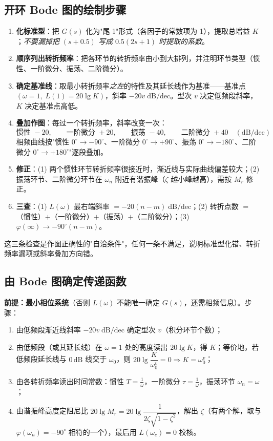 \subsection{开环 Bode 图的绘制步骤}
\begin{enumerate}
    \item \textbf{化标准型}：把 $G(s)$ 化为"尾 1"形式（各因子的常数项为 1），提取总增益 $K$；\emph{不要漏掉把 $(s+0.5)$ 写成 $0.5(2s+1)$ 时提取的系数}。
    \item \textbf{顺序列出转折频率}：把各环节的转折频率由小到大排列，并注明环节类型（惯性、一阶微分、振荡、二阶微分）。
    \item \textbf{确定基准线}：取最小转折频率\emph{之左}的特性及其延长线作为基准——基准点 $(\omega=1,\;L(1)=20\lg K)$，斜率 $-20v\;\mathrm{dB/dec}$。型次 $v$ 决定低频段斜率，$K$ 决定基准点高低。
    \item \textbf{叠加作图}：每过一个转折频率，斜率改变一次：
    \[
    \text{惯性 }-20,\qquad \text{一阶微分 }+20,\qquad \text{振荡 }-40,\qquad \text{二阶微分 }+40\quad(\mathrm{dB/dec})
    \]
    相频曲线按"惯性 $0^\circ\to-90^\circ$、一阶微分 $0^\circ\to+90^\circ$、振荡 $0^\circ\to-180^\circ$、二阶微分 $0^\circ\to+180^\circ$"逐段叠加。
    \item \textbf{修正}：(1) 两个惯性环节转折频率很接近时，渐近线与实际曲线偏差较大；(2) 振荡环节、二阶微分环节在 $\omega_n$ 附近有谐振峰（$\zeta$ 越小峰越高），需按 $M_r$ 修正。
    \item \textbf{三查}：(1) $L(\omega)$ 最右端斜率 $=-20(n-m)\;\mathrm{dB/dec}$；(2) 转折点数 $=$（惯性）$+$（一阶微分）$+$（振荡）$+$（二阶微分）；(3) $\varphi(\infty)\to-90^\circ(n-m)$。
\end{enumerate}
\noindent 这三条检查是作图正确性的"自洽条件"，任何一条不满足，说明标准型化错、转折频率漏项或斜率叠加方向错。

\subsection{由 Bode 图确定传递函数}
\textbf{前提：最小相位系统}（否则 $L(\omega)$ 不能唯一确定 $G(s)$，还需相频信息）。步骤：
\begin{enumerate}
    \item 由低频段渐近线斜率 $-20v\;\mathrm{dB/dec}$ 确定型次 $v$（积分环节个数）；
    \item 由低频段（或其延长线）在 $\omega=1$ 处的高度读出 $20\lg K$，得 $K$；等价地，若低频段延长线与 $0\,\mathrm{dB}$ 线交于 $\omega_0$，则 $20\lg\dfrac{K}{\omega_0^{v}}=0\Rightarrow K=\omega_0^{v}$；
    \item 由各转折频率读出时间常数：惯性 $T=\frac{1}{\omega}$，一阶微分 $\tau=\frac{1}{\omega}$，振荡环节 $\omega_n=\omega$；
    \item 由谐振峰高度定阻尼比 $20\lg M_r=20\lg\dfrac{1}{2\zeta\sqrt{1-\zeta^2}}$，解出 $\zeta$（有两个解，取与 $\varphi(\omega_n)=-90^\circ$ 相符的一个），最后用 $L(\omega_c)=0$ 校核。
\end{enumerate}

